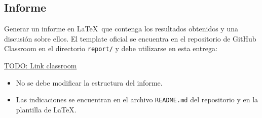 \subsection{Informe} \label{subsec:report}

Generar un informe en \LaTeX\ que contenga los resultados obtenidos y una discusión sobre ellos.  
El template oficial se encuentra en el repositorio de GitHub Classroom en el directorio \texttt{report/} y debe utilizarse en esta entrega:

\begin{mdframed}
\begin{center}
    \url{TODO: Link classroom}
\end{center}
\end{mdframed}

\begin{itemize}
    \item No se debe modificar la estructura del informe.
    \item Las indicaciones se encuentran en el archivo \texttt{README.md} del repositorio y en la plantilla de \LaTeX.
\end{itemize}
